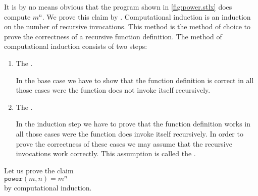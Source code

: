 It is by no means obvious that the program shown in \ref{fig:power.stlx} does compute
$m^n$.  We prove this claim by  .
Computational induction is an induction on the number of recursive invocations.
This method is the method of choice to prove the correctness of a recursive function definition.
The method of computational induction consists of two steps:
\begin{enumerate}
\item The .

      In the base case we have to show that the function definition is correct in all those cases were the function
      does not invoke itself recursively.
\item The .

      In the induction step we have to prove that the function definition works in all those cases were
      the function does invoke itself recursively.  In order to prove the correctness of these cases we may
      assume that the recursive invocations work correctly.  This assumption is called the
      .
\end{enumerate}
Let us prove the claim 
\\[0.2cm]
\hspace*{1.3cm}
 $\mathtt{power}(m,n) = m^n$
\\[0.2cm] 
by computational induction.
